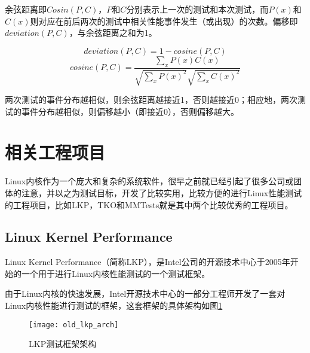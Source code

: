 余弦距离即$Cosin(P, C)$，$P$和$C$分别表示上一次的测试和本次测试，而$P(x)$和$C(x)$则对应在前后两次的测试中相关性能事件发生（或出现）的次数。偏移即$deviation(P, C)$，与余弦距离之和为1。

\begin{equation}
\label{equ:dev-cos} deviation(P, C) = 1 - cosine(P, C)
\end{equation}
\begin{equation}
\label{equ:dist-cos} cosine(P, C) = \frac{\sum_x P(x)C(x)}{\sqrt{\sum_xP(x)^2}\sqrt{\sum_xC(x)^2}}
\end{equation}

两次测试的事件分布越相似，则余弦距离越接近1，否则越接近0；相应地，两次测试的事件分布越相似，则偏移越小（即接近0），否则偏移越大。


\section{相关工程项目}

Linux内核作为一个庞大和复杂的系统软件，很早之前就已经引起了很多公司或团体的注意，并以之为测试目标，开发了比较实用，比较方便的进行Linux性能测试的工程项目，比如LKP\cite{chen2007keeping}，TKO\cite{bligh2006fully}和MMTests就是其中两个比较优秀的工程项目。

\subsection{Linux Kernel Performance}

Linux Kernel Performance（简称LKP），是Intel公司的开源技术中心于2005年开始的一个用于进行Linux内核性能测试的一个测试框架。

由于Linux内核的快速发展，Intel开源技术中心的一部分工程师开发了一套对Linux内核性能进行测试的框架，这套框架的具体架构如图\ref{fig:old_lkp_arch}

\begin{figure}[H]
\centering
\texttt{[image: old\_lkp\_arch]}
\caption{LKP测试框架架构}
\label{fig:old_lkp_arch}
\end{figure}

